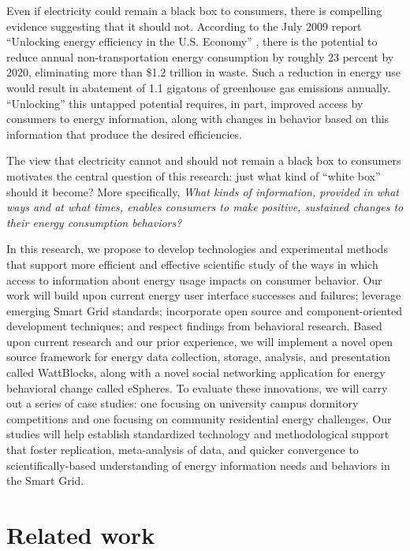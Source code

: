 Even if electricity could remain a black box to consumers, there is
compelling evidence suggesting that it should not.  According to the July
2009 report ``Unlocking energy efficiency in the U.S. Economy''
\cite{Granade09}, there is the potential to reduce annual
non-transportation energy consumption by roughly 23 percent by 2020,
eliminating more than \$1.2 trillion in waste.  Such a reduction in energy
use would result in abatement of 1.1 gigatons of greenhouse gas emissions
annually. ``Unlocking'' this untapped potential requires, in part, improved
access by consumers to energy information, along with changes in behavior
based on this information that produce the desired efficiencies.

The view that electricity cannot and should not remain a black box to
consumers motivates the central question of this research: just what kind of
``white box'' should it become?  More specifically, {\em What kinds of
  information, provided in what ways and at what times, enables consumers
  to make positive, sustained changes to their energy consumption
  behaviors?}

In this research, we propose to develop technologies and experimental
methods that support more efficient and effective scientific study of the
ways in which access to information about energy usage impacts on consumer
behavior.  Our work will build upon current energy user interface successes
and failures; leverage emerging Smart Grid standards; incorporate open
source and component-oriented development techniques; and respect findings
from behavioral research. Based upon current research and our prior
experience, we will implement a novel open source framework for energy data
collection, storage, analysis, and presentation called WattBlocks, along
with a novel social networking application for energy behavioral change
called eSpheres.  To evaluate these innovations, we will carry out a series of case studies:
one focusing on university campus dormitory competitions and one focusing
on community residential energy challenges. Our studies will help establish standardized technology
and methodological support that foster replication, meta-analysis of data,
and quicker convergence to scientifically-based understanding of energy
information needs and behaviors in the Smart Grid.

\section{Related work}
\label{sec:related-work}

